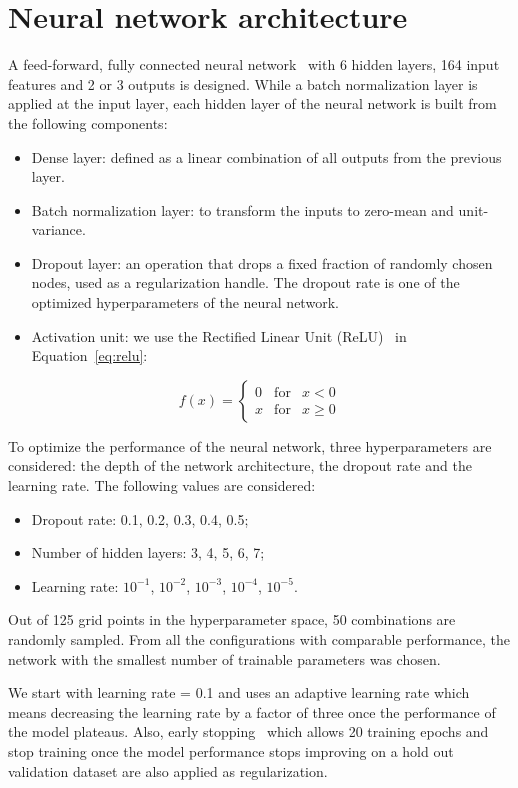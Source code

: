 \section{Neural network architecture}
\label{sec:dnn}
A feed-forward, fully connected neural network~\cite{hopfield1982neural} with 6 hidden layers, 164 input features and 2 or 3 outputs is designed. While a batch normalization layer is applied at the input layer, each hidden layer of the neural network is built from the following components: 
\begin{itemize}


\item Dense layer: defined as a linear combination of all outputs from the previous layer. 
\item Batch normalization layer: to transform the inputs to zero-mean and unit-variance. ~\cite{DBLP:journals/corr/IoffeS15}
\item Dropout layer: an operation that drops a fixed fraction of randomly chosen nodes, used as a regularization handle. The dropout rate is one of the optimized hyperparameters of the neural network.~\cite{JMLR:v15:srivastava14a}
\item Activation unit: we use the Rectified Linear Unit (ReLU)~\cite{inproceedings} in Equation~\ref{eq:relu}:	
\end{itemize}				
\begin{equation}
f(x) = \left \{ \begin{array}{rcl}
0 & \mbox{for} & x < 0\\ x & \mbox{for} & x \ge 0\end{array} \right. \label{eq:relu}
\end{equation}
			
			
To optimize the performance of the neural network, three hyperparameters are considered: the depth of the network architecture, the dropout rate and the learning rate. The following values are considered:



\begin{itemize}


\item Dropout rate: 0.1, 0.2, 0.3, 0.4, 0.5;
\item Number of hidden layers: 3, 4, 5, 6, 7;
\item Learning rate: $10^{−1}$, $10^{−2}$, $10^{−3}$, $10^{−4}$, $10^{−5}$.
\end{itemize}		
\par Out of 125 grid points in the hyperparameter space, 50 combinations are randomly sampled. From all the configurations with comparable performance, 
the network with the smallest number of trainable parameters was chosen. 
\par We start with learning rate = 0.1 and uses an adaptive learning rate which means decreasing the learning rate by a factor of three once the performance of the model plateaus. Also, early stopping~\cite{Yao07onearly} which allows 20 training epochs and stop training once the model performance stops improving on a hold out validation dataset are also applied as regularization. 

